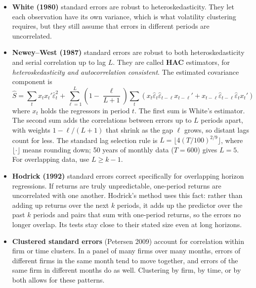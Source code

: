 \begin{itemize}
  \item \textbf{White (1980)} standard errors are robust to heteroskedasticity. They let each observation have its own variance, which is what volatility clustering requires, but they still assume that errors in different periods are uncorrelated.
  \item \textbf{Newey--West (1987)} standard errors are robust to both heteroskedasticity and serial correlation up to lag $L$. They are called \textbf{HAC} estimators, for \emph{heteroskedasticity and autocorrelation consistent}. The estimated covariance component is
  \begin{equation}
    \hat S = \sum_t x_t x_t' \hat\varepsilon_t^2 + \sum_{\ell=1}^{L} \left(1 - \frac{\ell}{L+1}\right) \sum_t \left(x_t \hat\varepsilon_t \hat\varepsilon_{t-\ell} x_{t-\ell}' + x_{t-\ell} \hat\varepsilon_{t-\ell} \hat\varepsilon_t x_t'\right)
    \label{eq:03-nw}
  \end{equation}
  where $x_t$ holds the regressors in period $t$. The first sum is White's estimator. The second sum adds the correlations between errors up to $L$ periods apart, with weights $1 - \ell/(L+1)$ that shrink as the gap $\ell$ grows, so distant lags count for less. The standard lag selection rule is $L = \lfloor 4(T/100)^{2/9} \rfloor$, where $\lfloor\cdot\rfloor$ means rounding down; 50 years of monthly data ($T = 600$) gives $L = 5$. For overlapping data, use $L \ge k-1$.
  \item \textbf{Hodrick (1992)} standard errors correct specifically for overlapping horizon regressions. If returns are truly unpredictable, one-period returns are uncorrelated with one another. Hodrick's method uses this fact: rather than adding up returns over the next $k$ periods, it adds up the predictor over the past $k$ periods and pairs that sum with one-period returns, so the errors no longer overlap. Its tests stay close to their stated size even at long horizons.
  \item \textbf{Clustered standard errors} (Petersen 2009) account for correlation within firm or time clusters. In a panel of many firms over many months, errors of different firms in the same month tend to move together, and errors of the same firm in different months do as well. Clustering by firm, by time, or by both allows for these patterns.
\end{itemize}

